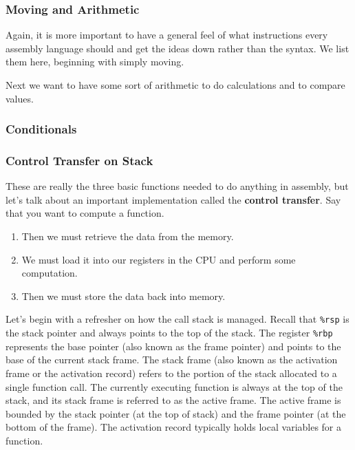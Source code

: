 \documentclass{article}
\begin{document}
    \subsubsection{Moving and Arithmetic} 

      Again, it is more important to have a general feel of what instructions every assembly language should  and get the ideas down rather than the syntax. We list them here, beginning with simply moving. 


      \begin{definition}[Moving]
        
      \end{definition}

      Next we want to have some sort of arithmetic to do calculations and to compare values. 

      \begin{definition}
        
      \end{definition}

    \subsubsection{Conditionals}

      \begin{definition}[Conditionals]
        
      \end{definition}

    \subsubsection{Control Transfer on Stack}

      These are really the three basic functions needed to do anything in assembly, but let's talk about an important implementation called the \textbf{control transfer}. Say that you want to compute a function. 
      \begin{enumerate}
        \item Then we must retrieve the data from the memory. 
        \item We must load it into our registers in the CPU and perform some computation. 
        \item Then we must store the data back into memory. 
      \end{enumerate}

      Let’s begin with a refresher on how the call stack is managed. Recall that \texttt{\%rsp} is the stack pointer and always points to the top of the stack. The register \texttt{\%rbp} represents the base pointer (also known as the frame pointer) and points to the base of the current stack frame. The stack frame (also known as the activation frame or the activation record) refers to the portion of the stack allocated to a single function call. The currently executing function is always at the top of the stack, and its stack frame is referred to as the active frame. The active frame is bounded by the stack pointer (at the top of stack) and the frame pointer (at the bottom of the frame). The activation record typically holds local variables for a function.
\end{document}
